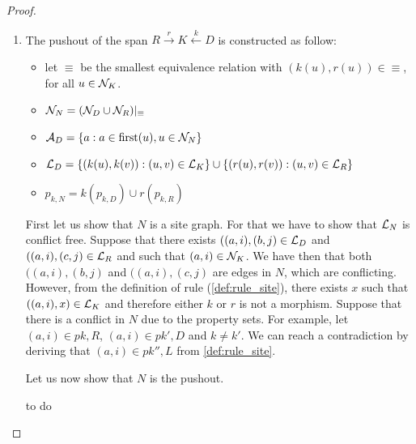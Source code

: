 \begin{proof}
\begin{enumerate}
  \item The pushout of the span $R\overset{r}{\rightarrow}K\overset{k}{\leftarrow} D$ is constructed as follow:
    \begin{itemize}
    \item let $\equiv$ be the smallest equivalence relation with $(k(u),r(u))\in\equiv$, for all $u\in\mathcal{N}_K$.
    \item $\mathcal{N}_N = (\mathcal{N}_D\cup \mathcal{N}_R)|_{\equiv}$
    \item $\mathcal{A}_D = \{a: a\in \text{first}(u), u\in\mathcal{N}_N\}$
    \item $\mathcal{L}_D = \{(k(u),k(v)) : (u,v)\in\mathcal{L}_K\}\cup\{(r(u),r(v)) : (u,v)\in\mathcal{L}_R\}$
    \item $p_{k,N} = k(p_{k,D}) \cup r(p_{k,R})$
    \end{itemize}
    First let us show that $N$ is a site graph. For that we have to show that $\mathcal{L}_N$ is conflict free. Suppose that there exists $((a,i),(b,j)\in \mathcal{L}_D$ and $((a,i),(c,j)\in \mathcal{L}_R$ and such that $(a,i)\in\mathcal{N}_K$. We have then that both $((a,i),(b,j)$ and $((a,i),(c,j)$ are edges in $N$, which are conflicting. However, from the definition of rule (\autoref{def:rule_site}), there exists $x$ such that $((a,i),x)\in\mathcal{L}_K$ and therefore either $k$ or $r$ is not a morphism.
%
    Suppose that there is a conflict in $N$ due to the property sets. For example, let $(a,i)\in p{k,R}$, $(a,i)\in p{k',D}$ and $k\neq k'$. We can reach a contradiction by deriving that $(a,i)\in p{k'',L}$ from \autoref{def:rule_site}.

    Let us now show that $N$ is the pushout.
  \begin{mdframed}[backgroundcolor=blue!20]
    to do
  \end{mdframed}
 \end{enumerate}
 \end{proof}

%

